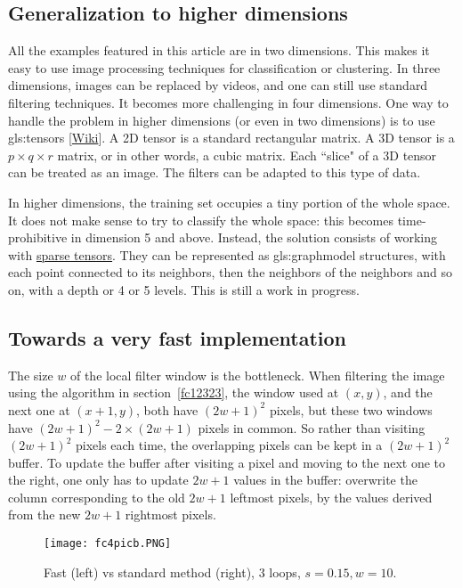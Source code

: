 \documentclass[oneside,10pt]{book}
\begin{document}
\subsection{Generalization to higher dimensions}

All the examples featured in this article are in two dimensions. This makes it easy to use image processing techniques for classification or clustering. In three dimensions, images can be replaced by videos, and one can still use standard filtering techniques. It becomes more challenging in four dimensions. One way to handle the problem in higher dimensions (or even in two dimensions) is to use \glspl{gls:tensor} [\href{https://en.wikipedia.org/wiki/Tensor}{Wiki}]. A 2D tensor is a standard rectangular matrix. A 3D tensor is a $p\times q\times r$ matrix, or in other words, a cubic matrix. Each ``slice" of a 3D tensor can be treated as an image. The filters can be adapted to this type of data.

In higher dimensions, the training set occupies a tiny portion of the whole space.  It does not make sense to try to classify the whole space: this becomes time-prohibitive in dimension 5 and above. Instead, the solution consists of working with \href{https://www.tensorflow.org/guide/sparse_tensor}{sparse tensors}. They can be represented as \gls{gls:graphmodel} structures, with each point connected to its neighbors, then the neighbors of the neighbors and so on, with a depth or 4 or 5 levels. This is still a work in progress.

\subsection{Towards a very fast implementation}\label{fctav}

 The size $w$ of the local filter window is the bottleneck. 
When filtering the image using the algorithm in section~\ref{fc12323}, the window used at $(x,y)$, and the next one at $(x+1,y)$, both have $(2w+1)^2$ pixels, but these two windows have $(2w+1)^2 - 2\times (2w+1)$ pixels in common. So rather than visiting $(2w+1)^2$ pixels each time, the overlapping pixels can be kept in a $(2w+1)^2$ buffer. To update the buffer after visiting a pixel and moving to the next one to the right, one only has to update $2w+1$ values in the buffer: overwrite the column corresponding to the old $2w+1$ leftmost pixels, by the values derived from the new $2w+1$ rightmost pixels.  

\begin{figure}[H]
\centering
\texttt{[image: fc4picb.PNG]}
\caption{Fast (left) vs standard method (right), $3$ loops, $s=0.15, w=10$.}
\label{fc4picb}
\end{figure}
\end{document}
